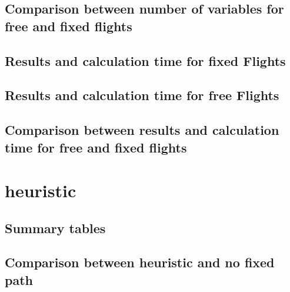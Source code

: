 \documentclass[a4paper,12pt]{report}
\begin{document}
\subsection{Comparison between number of variables for free and fixed flights}

\subsection{Results and calculation time for fixed Flights}

\subsection{Results and calculation time for free Flights}

\subsection{Comparison between results and calculation time for free and fixed flights}

\section{heuristic}
\subsection{Summary tables}
\label{chap:heuristic:tables}
\subsection{Comparison between heuristic and no fixed path}

\end{document}

